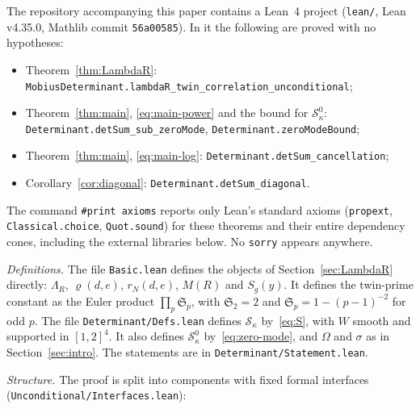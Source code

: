 \documentclass[11pt]{amsart}
\theoremstyle{definition}
\theoremstyle{remark}
\numberwithin{equation}{section}
\newcommand{\cS}{\mathcal S}
\begin{document}
The repository accompanying this paper contains a Lean~4 project
(\texttt{lean/}, Lean v4.35.0, Mathlib commit \texttt{56a00585}).  In it the
following are proved with no hypotheses:
\begin{itemize}
\item Theorem~\ref{thm:LambdaR}:
\texttt{MobiusDeterminant.lambdaR\_twin\_correlation\_unconditional};
\item Theorem~\ref{thm:main}, \eqref{eq:main-power} and the bound for
$\cS^0_\kappa$: \texttt{Determinant.detSum\_sub\_zeroMode},
\texttt{Determinant.zeroModeBound};
\item Theorem~\ref{thm:main}, \eqref{eq:main-log}:
\texttt{Determinant.detSum\_cancellation};
\item Corollary~\ref{cor:diagonal}: \texttt{Determinant.detSum\_diagonal}.
\end{itemize}
The command \texttt{\#print axioms} reports only Lean's standard axioms
(\texttt{propext}, \texttt{Classical.choice}, \texttt{Quot.sound}) for these
theorems and their entire dependency cones, including the external libraries
below.  No \texttt{sorry} appears anywhere.

\emph{Definitions.}  The file \texttt{Basic.lean} defines the objects of
Section~\ref{sec:LambdaR} directly: $\Lambda_R$, $\varrho(d,e)$, $r_N(d,e)$,
$M(R)$ and $S_g(y)$.  It defines the twin-prime constant as the Euler
product $\prod_p\mathfrak S_p$, with $\mathfrak S_2=2$ and
$\mathfrak S_p=1-(p-1)^{-2}$ for odd $p$.  The file
\texttt{Determinant/Defs.lean} defines $\cS_\kappa$ by~\eqref{eq:S}, with $W$
smooth and supported in $[1,2]^4$.  It also defines $\cS^0_\kappa$
by~\eqref{eq:zero-mode}, and $\Omega$ and $\sigma$ as in
Section~\ref{sec:intro}.  The statements are in
\texttt{Determinant/Statement.lean}.

\emph{Structure.}  The proof is split into components with fixed formal
interfaces (\texttt{Unconditional/Interfaces.lean}):
\end{document}
